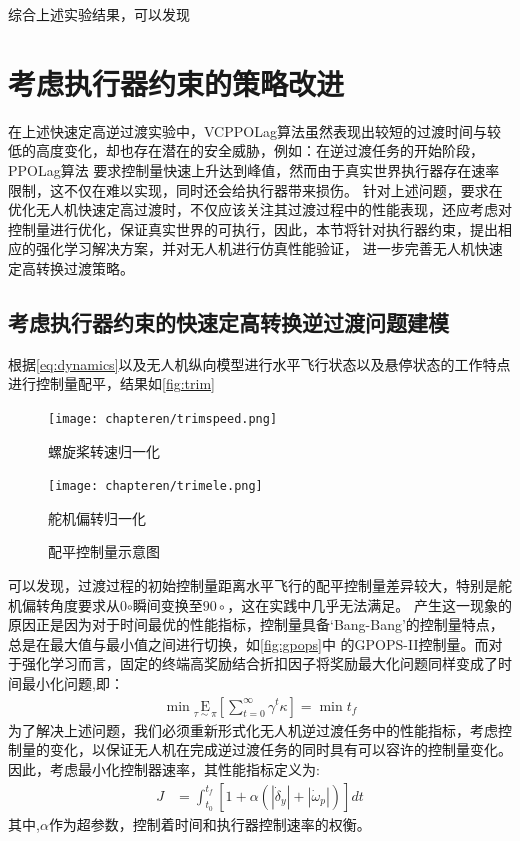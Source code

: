 综合上述实验结果，可以发现

\section{考虑执行器约束的策略改进}
在上述快速定高逆过渡实验中，VCPPOLag算法虽然表现出较短的过渡时间与较低的高度变化，却也存在潜在的安全威胁，例如：在逆过渡任务的开始阶段，PPOLag算法
要求控制量快速上升达到峰值，然而由于真实世界执行器存在速率限制，这不仅在难以实现，同时还会给执行器带来损伤。
针对上述问题，要求在优化无人机快速定高过渡时，不仅应该关注其过渡过程中的性能表现，还应考虑对控制量进行优化，保证真实世界的可执行，因此，本节将针对执行器约束，提出相应的强化学习解决方案，并对无人机进行仿真性能验证，
进一步完善无人机快速定高转换过渡策略。
\subsection{考虑执行器约束的快速定高转换逆过渡问题建模}
根据\autoref{eq:dynamics}以及无人机纵向模型进行水平飞行状态以及悬停状态的工作特点进行控制量配平，结果如\autoref{fig:trim}
\begin{figure}[htbp]
    \centering
    \begin{minipage}{1.0\linewidth}
        \centering
        \texttt{[image: chapteren/trimspeed.png]}
        \caption{螺旋桨转速归一化}
        \label{fig:reward_cmp3}
    \end{minipage}
    \begin{minipage}{1.0\linewidth}
        \centering
        \texttt{[image: chapteren/trimele.png]}
        \caption{舵机偏转归一化}
        \label{fig:cost_cmp3}
    \end{minipage}
    \caption{配平控制量示意图}
    \label{fig:trim}
\end{figure}

可以发现，过渡过程的初始控制量距离水平飞行的配平控制量差异较大，特别是舵机偏转角度要求从0$\circ$瞬间变换至$90\circ$，这在实践中几乎无法满足。
产生这一现象的原因正是因为对于时间最优的性能指标，控制量具备‘Bang-Bang’的控制量特点，总是在最大值与最小值之间进行切换，如\autoref{fig:gpops}中
的GPOPS-II控制量。而对于强化学习而言，固定的终端高奖励结合折扣因子将奖励最大化问题同样变成了时间最小化问题,即：
\begin{align}
    \min  \underset{\tau \sim \pi }{\mathrm{E}}\left[\sum_{t=0}^{\infty} \gamma^{t}\kappa\right]=\min t_{f}
\end{align}
为了解决上述问题，我们必须重新形式化无人机逆过渡任务中的性能指标，考虑控制量的变化，以保证无人机在完成逆过渡任务的同时具有可以容许的控制量变化。
因此，考虑最小化控制器速率，其性能指标定义为:
\begin{align}
    J & = \int_{t_{0}}^{t_{f}}\left[1+\alpha (\left |\dot \delta_{y} \right |+\left |\dot \omega_{p} \right |)\right] d t
\end{align}
其中,$\alpha$作为超参数，控制着时间和执行器控制速率的权衡。

